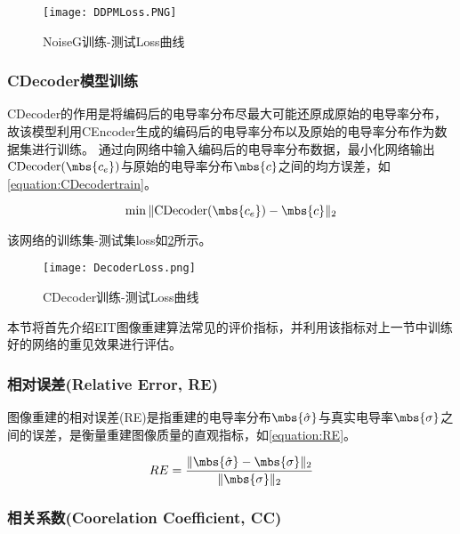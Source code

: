 \begin{figure}[H]
    \centering
    \texttt{[image: DDPMLoss.PNG]}
    \caption{NoiseG训练-测试Loss曲线}
    \label{figure:DDPMLoss}
\end{figure}

\subsubsection{CDecoder模型训练}

CDecoder的作用是将编码后的电导率分布尽最大可能还原成原始的电导率分布，故该模型利用CEncoder生成的编码后的电导率分布以及原始的电导率分布作为数据集进行训练。
通过向网络中输入编码后的电导率分布数据，最小化网络输出$\text{CDecoder}(\mbs{c_e})$与原始的电导率分布$\mbs{c}$之间的均方误差，如\cref{equation:CDecodertrain}。

\begin{equation}
    \label{equation:CDecodertrain}
    \min \|\text{CDecoder}(\mbs{c_e}) - \mbs{c}\|_2
\end{equation}

该网络的训练集-测试集loss如\cref{figure:DecoderLoss}所示。
\begin{figure}[h]
    \centering
    \texttt{[image: DecoderLoss.png]}
    \caption{CDecoder训练-测试Loss曲线}
    \label{figure:DecoderLoss}
\end{figure} 


本节将首先介绍EIT图像重建算法常见的评价指标，并利用该指标对上一节中训练好的网络的重见效果进行评估。

\subsubsection{相对误差(Relative Error, RE)}

图像重建的相对误差(RE)是指重建的电导率分布$\mbs{\hat{\sigma}}$与真实电导率$\mbs{\sigma}$之间的误差，是衡量重建图像质量的直观指标，如\cref{equation:RE}。

\begin{equation}
    \label{equation:RE}
    RE = \frac{\| \mbs{\hat{\sigma}} - \mbs{\sigma}\|_2}{\|\mbs{\sigma}\|_2}
\end{equation}

\subsubsection{相关系数(Coorelation Coefficient, CC)}

